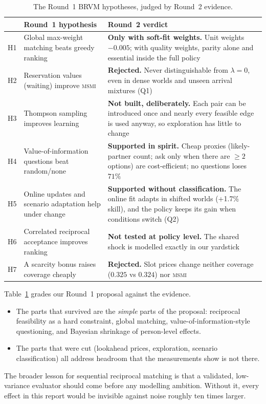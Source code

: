 \documentclass[10pt]{article}
\newcommand{\msmi}{\textsc{msmi}}
\begin{document}
\begin{table}[t]
\centering\small
\caption{The Round~1 BRVM hypotheses, judged by Round~2 evidence.}
\label{tab:hyp}
\begin{tabularx}{\linewidth}{@{}lXX@{}}
\toprule
& Round~1 hypothesis & Round~2 verdict \\
\midrule
H1 & Global max-weight matching beats greedy ranking & \textbf{Only with soft-fit weights.} Unit weights $-0.005$; with quality weights, parity alone and essential inside the full policy \\
H2 & Reservation values (waiting) improve \msmi & \textbf{Rejected.} Never distinguishable from $\lambda=0$, even in dense worlds and unseen arrival mixtures (Q1) \\
H3 & Thompson sampling improves learning & \textbf{Not built, deliberately.} Each pair can be introduced once and nearly every feasible edge is used anyway, so exploration has little to change \\
H4 & Value-of-information questions beat random/none & \textbf{Supported in spirit.} Cheap proxies (likely-partner count; ask only when there are $\geq2$ options) are cost-efficient; no questions loses $71\%$ \\
H5 & Online updates and scenario adaptation help under change & \textbf{Supported without classification.} The online fit adapts in shifted worlds (+1.7\% skill), and the policy keeps its gain when conditions switch (Q2) \\
H6 & Correlated reciprocal acceptance improves ranking & \textbf{Not tested at policy level.} The shared shock is modelled exactly in our yardstick \\
H7 & A scarcity bonus raises coverage cheaply & \textbf{Rejected.} Slot prices change neither coverage ($0.325$ vs $0.324$) nor \msmi \\
\bottomrule
\end{tabularx}
\end{table}

Table~\ref{tab:hyp} grades our Round~1 proposal against the evidence.
\begin{itemize}
\item The parts that survived are the \emph{simple} parts of the proposal: reciprocal feasibility as a hard constraint, global matching, value-of-information-style questioning, and Bayesian shrinkage of person-level effects.
\item The parts that were cut (lookahead prices, exploration, scenario classification) all address headroom that the measurements show is not there.
\end{itemize}
The broader lesson for sequential reciprocal matching is that a validated, low-variance evaluator should come before any modelling ambition. Without it, every effect in this report would be invisible against noise roughly ten times larger.
\end{document}
